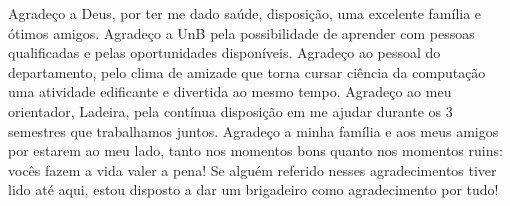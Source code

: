 Agradeço a Deus, por ter me dado saúde, disposição, uma excelente família e ótimos
amigos. 
Agradeço a UnB pela possibilidade de aprender com pessoas qualificadas e pelas 
oportunidades disponíveis.
Agradeço ao pessoal do departamento, pelo clima de
amizade que torna cursar ciência da computação uma atividade edificante e divertida
ao mesmo tempo. 
Agradeço ao meu orientador, Ladeira, pela contínua disposição em me ajudar durante
os 3 semestres que trabalhamos juntos. 
Agradeço a minha família e aos meus amigos por estarem ao meu lado, tanto nos
momentos bons quanto nos momentos ruins: vocês fazem a vida valer a pena! 
Se alguém referido nesses agradecimentos tiver lido até aqui, estou disposto a dar
um brigadeiro como agradecimento por tudo!
